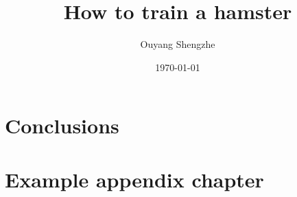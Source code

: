 \documentclass[ a4paper,
                oneside,
                toc=bibliography,
                toc=listof
                ]{scrbook}
\author{Ouyang Shengzhe}
\title{How to train a hamster}
\date{\today}
\begin{document}
 
    \frontmatter
    \makeISWtitle

	\cleardoublepage
	\setcounter{page}{1} %
    \declarationOfOriginality

    
    
    \cleardoublepage
    \tableofcontents
       

    \mainmatter
    


    
    
    
    
    
    
    \chapter{Conclusions}

    
    \cleardoublepage
    \printbibliography
    
     \cleardoublepage
    
    
    \cleardoublepage
    \listoffigures
    
    \cleardoublepage
    \listoftables
    
    
    
    \appendix
    \chapter{Example appendix chapter}
\end{document}
